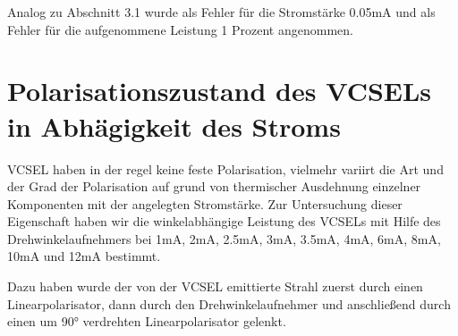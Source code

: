 \documentclass[bigchapter,colorback,accentcolor=tud4b,linedtoc,11pt]{tudreport}
\begin{document}
\begin{center}
\begin{figure}[h]
\end{figure}
\end{center}

Analog zu Abschnitt 3.1 wurde als Fehler für die Stromstärke 0.05mA und als Fehler für die aufgenommene Leistung 1 Prozent angenommen.

\section{Polarisationszustand des VCSELs in Abhägigkeit des Stroms}
VCSEL haben in der regel keine feste Polarisation, vielmehr variirt die Art und der Grad der Polarisation auf grund von thermischer Ausdehnung einzelner Komponenten mit der angelegten Stromstärke. Zur Untersuchung dieser Eigenschaft haben wir die winkelabhängige Leistung des VCSELs mit Hilfe des Drehwinkelaufnehmers bei 1mA, 2mA, 2.5mA, 3mA, 3.5mA, 4mA, 6mA, 8mA, 10mA und 12mA bestimmt.

Dazu haben wurde der von der VCSEL emittierte Strahl zuerst durch einen Linearpolarisator, dann durch den Drehwinkelaufnehmer und anschließend durch einen um 90° verdrehten Linearpolarisator gelenkt.
\end{document}
